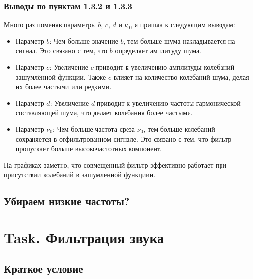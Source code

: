\documentclass[a4paper,12pt]{article}
\begin{document}
\subsubsection{Выводы по пунктам 1.3.2 и 1.3.3}

Много раз поменяв параметры \(b\), \(c\), \(d\) и \(\nu_0\), я пришла к следующим выводам:
\begin{itemize}
    \item Параметр \(b\): Чем больше значение \(b\), тем больше шума накладывается на сигнал. Это связано с тем, что \(b\) определяет амплитуду шума.
    \item Параметр \(c\): Увеличение \(c\) приводит к увеличению амплитуды колебаний зашумлённой функции. Также \(c\) влияет на количество колебаний шума, делая их более частыми или редкими.
    \item Параметр \(d\): Увеличение \(d\) приводит к увеличению частоты гармонической составляющей шума, что делает колебания более частыми.
    \item Параметр \(\nu_0\): Чем больше частота среза \(\nu_0\), тем больше колебаний сохраняется в отфильтрованном сигнале. Это связано с тем, что фильтр пропускает больше высокочастотных компонент.
\end{itemize}

На графиках заметно, что совмещенный фильтр эффективно работает при присутствии
колебаний в зашумленной функциии.


















\subsection{Убираем низкие частоты?}




\section{Task. Фильтрация звука}
\subsection{Краткое условие}
\end{document}
